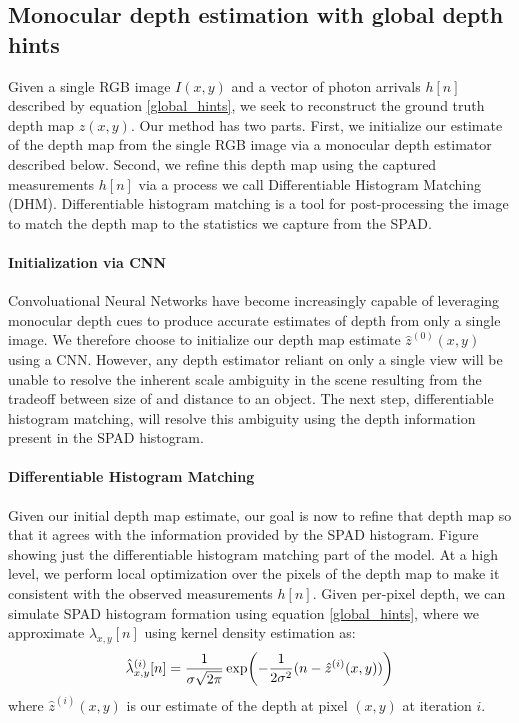 \subsection{Monocular depth estimation with global depth hints}
Given a single RGB image $I(x,y)$ and a vector of photon arrivals $h[n]$
described by equation \ref{global_hints}, we seek to
reconstruct the ground truth depth map $z(x,y)$.
Our method has two parts. First, we initialize our estimate of the depth map from the single RGB
image via a monocular depth estimator described below. Second, we refine this depth map using
the captured measurements $h[n]$ via a process we call Differentiable Histogram
Matching (DHM).
Differentiable histogram matching is a tool for post-processing the image to
match the depth map to the statistics we capture from the SPAD.

\paragraph{Initialization via CNN}
Convoluational Neural Networks have become increasingly capable of leveraging
monocular depth cues to produce accurate estimates of depth
from only a single image. We therefore choose to initialize our depth map
estimate $\hat z^{(0)}(x,y)$ using
a CNN. However, any depth estimator reliant on only a single
view will be unable to resolve the inherent scale ambiguity in the scene resulting
from the tradeoff between size of and distance to an object. The next step,
differentiable histogram matching, will resolve this ambiguity using the depth
information present in the SPAD histogram.

\paragraph{Differentiable Histogram Matching}
Given our initial depth map estimate, our goal is now to refine that depth map
so that it agrees with the information provided by the SPAD histogram.
Figure showing just the differentiable histogram matching part of the model.
At a high level, we perform local optimization over the pixels of the depth map
to make it consistent with the observed measurements $h[n]$.
Given per-pixel depth, we can simulate SPAD histogram formation using equation
\ref{global_hints}, where we approximate $\lambda_{x,y}[n]$ using kernel density
estimation \cite{something} as:
\begin{equation}
  \hat \lambda^{(i)}_{x,y}[n] = \frac{1}{\sigma\sqrt{2 \pi}}\exp\paren*{-\frac{1}{2\sigma^2}(n - \hat z^{(i)}(x,y))} \label{KDE}
\end{equation}
where $\hat z^{(i)}(x, y)$ is our estimate of the depth at pixel $(x,y)$ at
iteration $i$.

